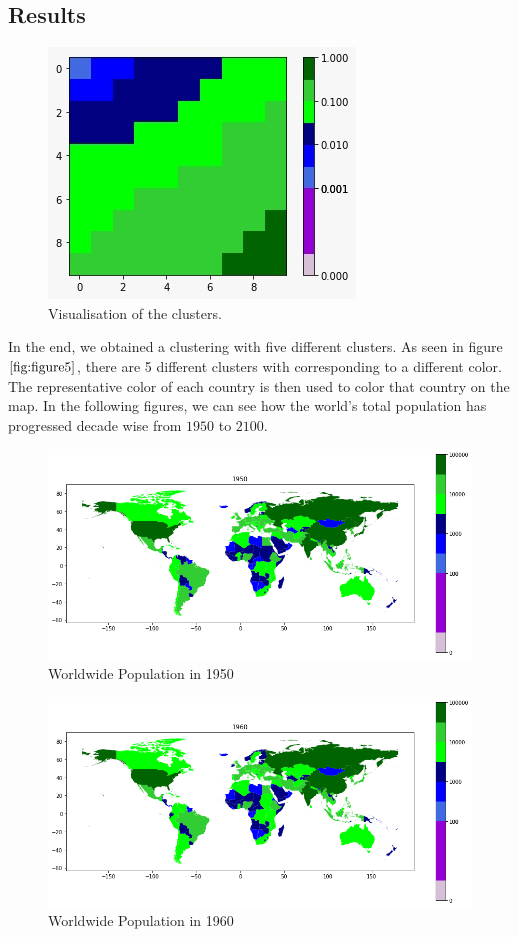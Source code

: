 \documentclass[a4paper, 11pt]{article}
\begin{document}
\subsection{Results}
\begin{figure}[h!]
    \centering
    \includegraphics[width=0.5 \textwidth]{Images_Q2/Cluster.jpeg}
    \caption{Visualisation of the clusters.}
    \label{fig:figure5}
\end{figure}
In the end, we obtained a clustering with five different clusters. As seen in figure $\ref{fig:figure5}$, there are 5 different clusters with corresponding to a  different color. The representative color of each country is then used to color that country on the map. In the following figures, we can see how the world's total population has progressed decade wise from $1950$ to $2100$.
\begin{figure}[h!]
    \centering
    \includegraphics[width=0.9 \textwidth]{Images_Q2/1950.png}
    \caption{Worldwide Population in 1950}
    \label{fig:figure6}
\end{figure}
\newpage
\begin{figure}[h!]
    \centering
    \includegraphics[width=0.9 \textwidth]{Images_Q2/1960.png}
    \caption{Worldwide Population in 1960}
    \label{fig:figure7}
\end{figure}
\end{document}
